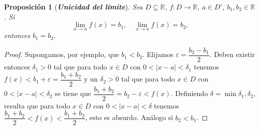 \documentclass[12pt]{article}
\newtheorem{proposition}[theorem]{Proposición}
\begin{document}
\begin{proposition}[\textbf{\textit{Unicidad del límite}}] Sea $D \subseteq \mathbb{R}$, $f \colon D \longrightarrow \mathbb{R}$, $a \in D'$, $b_1,b_2 \in \mathbb{R}$. Si $$\lim_{x \rightarrow a} f(x) = b_1, \quad \lim_{x\rightarrow a} f(x) = b_2,$$ entonces $b_1 = b_2.$
\end{proposition}
\begin{proof}
Supongamos, por ejemplo, que $b_1 < b_2$. Elijamos $\varepsilon = \dfrac{b_2-b_1}{2}$. Deben existir entonces $\delta_1 >0$ tal que para todo $x \in D$ con $0 <|x-a| < \delta_1$ tenemos $f(x) < b_1 + \varepsilon = \dfrac{b_1+b_2}{2}$ y un $\delta_2 >0$ tal que para todo $x \in D$ con $0 < |x-a | < \delta_2$ se tiene que $\dfrac{b_1+b_2}{2} = b_2-\varepsilon < f(x)$. Definiendo $\delta = \min{\delta_1, \delta_2}$, resulta que para todo $x \in D$ con $0 < |x-a | < \delta$ tenemos $\dfrac{b_1+b_2}{2} < f(x) < \dfrac{b_1+b_2}{2}$, esto es absurdo. Análogo si $b_2 <b_1$.

\end{proof}
\end{document}
